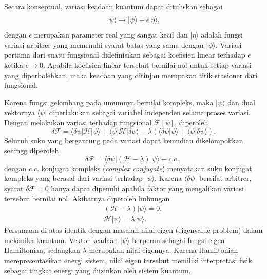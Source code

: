 Secara konseptual, variasi keadaan kuantum dapat dituliskan sebagai
\begin{equation}
    \label{eq:variasi_keadaan}
    \ket{\psi} \to |\psi\rangle + \epsilon|\eta\rangle,
\end{equation}
dengan $\epsilon$ merupakan parameter real yang sangat kecil dan $|\eta\rangle$ adalah fungsi variasi arbitrer yang memenuhi syarat batas yang sama dengan $|\psi\rangle$. Variasi pertama dari suatu fungsional didefinisikan sebagai koefisien linear terhadap $\epsilon$ ketika $\epsilon \to 0$. Apabila koefisien linear tersebut bernilai nol untuk setiap variasi yang diperbolehkan, maka keadaan yang ditinjau merupakan titik stasioner dari fungsional.

Karena fungsi gelombang pada umumnya bernilai kompleks, maka $|\psi\rangle$ dan dual vektornya $\langle\psi|$ diperlakukan sebagai variabel independen selama proses variasi. Dengan melakukan variasi terhadap fungsional $\mathcal{F}[\psi]$, diperoleh
\begin{equation}
    \label{eq:variasi_fungsional}
    \delta \mathcal{F} = \langle \delta \psi | \mathcal{H} | \psi \rangle + \langle \psi | \mathcal{H} | \delta \psi \rangle - \lambda \left(\langle \delta \psi | \psi \rangle + \langle \psi | \delta \psi \rangle \right).
\end{equation}
Seluruh suku yang bergantung pada variasi dapat kemudian dikelompokkan sehingg diperoleh
\begin{equation} 
    \label{eq:variasi_fungsional_2}
    \delta \mathcal{F} = \langle \delta \psi | \left(\mathcal{H} - \lambda \right) | \psi \rangle + c.c.,
\end{equation}
dengan $c.c.$ konjugat kompleks (\textit{complex conjugate}) menyatakan suku konjugat kompleks yang berasal dari variasi terhadap $|\psi\rangle$. Karena $\langle\delta\psi|$ bersifat arbitrer, syarat $\delta\mathcal{F} = 0$ hanya dapat dipenuhi apabila faktor yang mengalikan variasi tersebut bernilai nol. Akibatnya diperoleh hubungan
\begin{equation}
    \begin{split}
    \left(\mathcal{H} - \lambda \right) | \psi \rangle = 0, \\
    \mathcal{H}|\psi\rangle = \lambda|\psi\rangle.
    \end{split}
\end{equation}
Persamaan di atas identik dengan masalah nilai eigen (eigenvalue problem) dalam mekanika kuantum. Vektor keadaan $|\psi\rangle$ berperan sebagai fungsi eigen Hamiltonian, sedangkan $\lambda$ merupakan nilai eigennya. Karena Hamiltonian merepresentasikan energi sistem, nilai eigen tersebut memiliki interpretasi fisik sebagai tingkat energi yang diizinkan oleh sistem kuantum.

